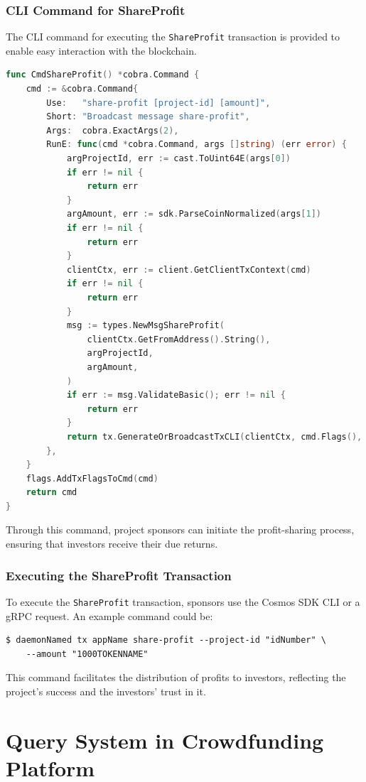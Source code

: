 \subsubsection{CLI Command for ShareProfit}

The CLI command for executing the \texttt{ShareProfit} transaction is provided to enable easy interaction with the blockchain.

\newpage
\begin{lstlisting}[language=go, caption=Share Profit CLI Definition, label={lst:share-profit-cli}]
func CmdShareProfit() *cobra.Command {
	cmd := &cobra.Command{
		Use:   "share-profit [project-id] [amount]",
		Short: "Broadcast message share-profit",
		Args:  cobra.ExactArgs(2),
		RunE: func(cmd *cobra.Command, args []string) (err error) {
			argProjectId, err := cast.ToUint64E(args[0])
			if err != nil {
				return err
			}
			argAmount, err := sdk.ParseCoinNormalized(args[1])
			if err != nil {
				return err
			}
			clientCtx, err := client.GetClientTxContext(cmd)
			if err != nil {
				return err
			}
			msg := types.NewMsgShareProfit(
				clientCtx.GetFromAddress().String(),
				argProjectId,
				argAmount,
			)
			if err := msg.ValidateBasic(); err != nil {
				return err
			}
			return tx.GenerateOrBroadcastTxCLI(clientCtx, cmd.Flags(), msg)
		},
	}
	flags.AddTxFlagsToCmd(cmd)
	return cmd
}
\end{lstlisting}

Through this command, project sponsors can initiate the profit-sharing process, ensuring that investors receive their due returns.

\subsubsection{Executing the ShareProfit Transaction}

To execute the \texttt{ShareProfit} transaction, sponsors use the Cosmos SDK CLI or a gRPC request. An example command could be:

\begin{verbatim}
$ daemonNamed tx appName share-profit --project-id "idNumber" \
    --amount "1000TOKENNAME"
\end{verbatim}

This command facilitates the distribution of profits to investors, reflecting the project's success and the investors' trust in it.


\section{Query System in Crowdfunding Platform}

